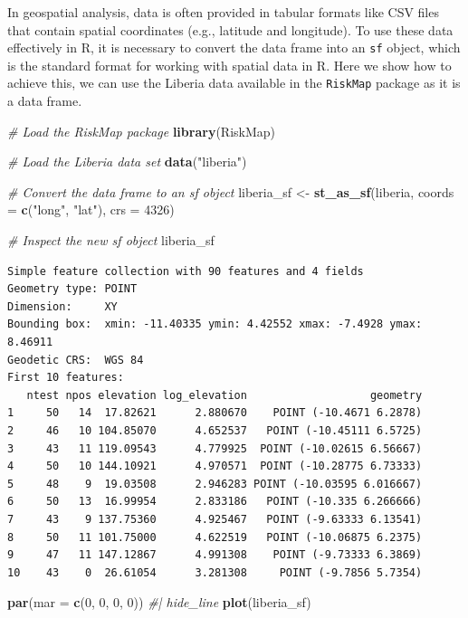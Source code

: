 \documentclass[
  letterpaper,
]{krantz}
\newenvironment{Shaded}{\begin{snugshade}}{\end{snugshade}}
\newcommand{\AttributeTok}[1]{\textcolor[rgb]{0.13,0.29,0.53}{#1}}
\newcommand{\CommentTok}[1]{\textcolor[rgb]{0.56,0.35,0.01}{\textit{#1}}}
\newcommand{\DecValTok}[1]{\textcolor[rgb]{0.00,0.00,0.81}{#1}}
\newcommand{\FunctionTok}[1]{\textcolor[rgb]{0.13,0.29,0.53}{\textbf{#1}}}
\newcommand{\NormalTok}[1]{#1}
\newcommand{\OtherTok}[1]{\textcolor[rgb]{0.56,0.35,0.01}{#1}}
\newcommand{\StringTok}[1]{\textcolor[rgb]{0.31,0.60,0.02}{#1}}
\begin{document}
In geospatial analysis, data is often provided in tabular formats like
CSV files that contain spatial coordinates (e.g., latitude and
longitude). To use these data effectively in R, it is necessary to
convert the data frame into an \texttt{sf} object, which is the standard
format for working with spatial data in R. Here we show how to achieve
this, we can use the Liberia data available in the \texttt{RiskMap}
package as it is a data frame.

\begin{Shaded}
\begin{Highlighting}[]
\CommentTok{\# Load the RiskMap package}
\FunctionTok{library}\NormalTok{(RiskMap)}

\CommentTok{\# Load the Liberia data set}
\FunctionTok{data}\NormalTok{(}\StringTok{"liberia"}\NormalTok{)}

\CommentTok{\# Convert the data frame to an sf object}
\NormalTok{liberia\_sf }\OtherTok{\textless{}{-}} \FunctionTok{st\_as\_sf}\NormalTok{(liberia, }
                       \AttributeTok{coords =} \FunctionTok{c}\NormalTok{(}\StringTok{"long"}\NormalTok{, }\StringTok{"lat"}\NormalTok{), }
                       \AttributeTok{crs =} \DecValTok{4326}\NormalTok{)}

\CommentTok{\# Inspect the new sf object}
\NormalTok{liberia\_sf}
\end{Highlighting}
\end{Shaded}

\begin{verbatim}
Simple feature collection with 90 features and 4 fields
Geometry type: POINT
Dimension:     XY
Bounding box:  xmin: -11.40335 ymin: 4.42552 xmax: -7.4928 ymax: 8.46911
Geodetic CRS:  WGS 84
First 10 features:
   ntest npos elevation log_elevation                   geometry
1     50   14  17.82621      2.880670    POINT (-10.4671 6.2878)
2     46   10 104.85070      4.652537   POINT (-10.45111 6.5725)
3     43   11 119.09543      4.779925  POINT (-10.02615 6.56667)
4     50   10 144.10921      4.970571  POINT (-10.28775 6.73333)
5     48    9  19.03508      2.946283 POINT (-10.03595 6.016667)
6     50   13  16.99954      2.833186   POINT (-10.335 6.266666)
7     43    9 137.75360      4.925467   POINT (-9.63333 6.13541)
8     50   11 101.75000      4.622519   POINT (-10.06875 6.2375)
9     47   11 147.12867      4.991308    POINT (-9.73333 6.3869)
10    43    0  26.61054      3.281308     POINT (-9.7856 5.7354)
\end{verbatim}

\begin{Shaded}
\begin{Highlighting}[]
\FunctionTok{par}\NormalTok{(}\AttributeTok{mar =} \FunctionTok{c}\NormalTok{(}\DecValTok{0}\NormalTok{, }\DecValTok{0}\NormalTok{, }\DecValTok{0}\NormalTok{, }\DecValTok{0}\NormalTok{))  }\CommentTok{\#| hide\_line}
\FunctionTok{plot}\NormalTok{(liberia\_sf)}
\end{Highlighting}
\end{Shaded}
\end{document}
